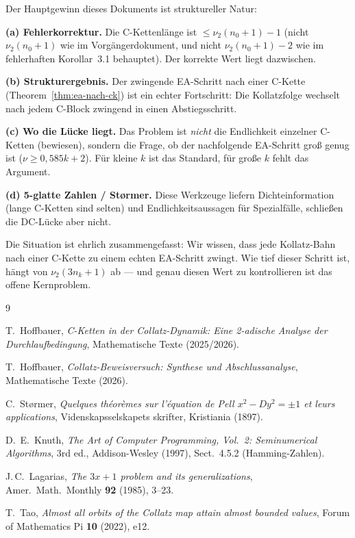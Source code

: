 \documentclass[12pt,a4paper]{article}
\newcommand{\vii}{\nu_2}
\begin{document}
	\begin{tcolorbox}[kernidee, title={Fazit}]
		Der Hauptgewinn dieses Dokuments ist struktureller Natur:
		
		\textbf{(a) Fehlerkorrektur.} Die C-Kettenlänge ist $\leq \vii(n_0+1) - 1$
		(nicht $\vii(n_0+1)$ wie im Vorgängerdokument, und nicht $\vii(n_0+1) - 2$
		wie im fehlerhaften Korollar~3.1 behauptet). Der korrekte Wert liegt dazwischen.
		
		\textbf{(b) Strukturergebnis.} Der zwingende EA-Schritt nach einer C-Kette
		(Theorem~\ref{thm:ea-nach-ck}) ist ein echter Fortschritt: Die Kollatzfolge
		wechselt nach jedem C-Block zwingend in einen Abstiegsschritt.
		
		\textbf{(c) Wo die Lücke liegt.} Das Problem ist \emph{nicht} die Endlichkeit
		einzelner C-Ketten (bewiesen), sondern die Frage, ob der nachfolgende EA-Schritt
		groß genug ist ($\nu \geq 0{,}585k + 2$). Für kleine $k$ ist das Standard,
		für große $k$ fehlt das Argument.
		
		\textbf{(d) 5-glatte Zahlen / Størmer.} Diese Werkzeuge liefern
		Dichteinformation (lange C-Ketten sind selten) und Endlichkeitsaussagen für
		Spezialfälle, schließen die DC-Lücke aber nicht.
		
		\medskip
		Die Situation ist ehrlich zusammengefasst: Wir wissen, dass jede Kollatz-Bahn
		nach einer C-Kette zu einem echten EA-Schritt zwingt. Wie tief dieser Schritt
		ist, hängt von $\vii(3n_k+1)$ ab --- und genau diesen Wert zu kontrollieren
		ist das offene Kernproblem.
	\end{tcolorbox}
	
	\begin{thebibliography}{9}
		
		T.\ Hoffbauer,
		\textit{C-Ketten in der Collatz-Dynamik: Eine 2-adische Analyse der
			Durchlaufbedingung},
		Mathematische Texte (2025/2026).
		
		T.\ Hoffbauer,
		\textit{Collatz-Beweisversuch: Synthese und Abschlussanalyse},
		Mathematische Texte (2026).
		
		C.\ Størmer,
		\textit{Quelques théorèmes sur l'équation de Pell $x^2 - Dy^2 = \pm 1$ et
			leurs applications},
		Videnskapsselskapets skrifter, Kristiania (1897).
		
		D.\ E.\ Knuth,
		\textit{The Art of Computer Programming, Vol.~2: Seminumerical Algorithms},
		3rd ed., Addison-Wesley (1997), Sect.~4.5.2 (Hamming-Zahlen).
		
		J.\,C.\ Lagarias,
		\textit{The $3x+1$ problem and its generalizations},
		Amer.\ Math.\ Monthly \textbf{92} (1985), 3--23.
		
		T.\ Tao,
		\textit{Almost all orbits of the Collatz map attain almost bounded values},
		Forum of Mathematics Pi \textbf{10} (2022), e12.
		
	\end{thebibliography}
	
\end{document}
